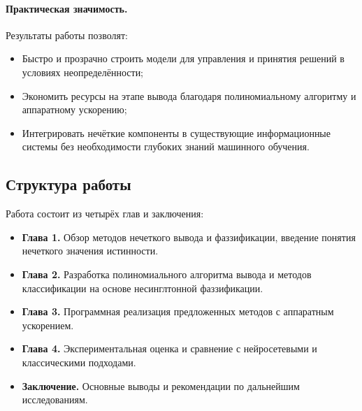\paragraph{Практическая значимость.} 

Результаты работы позволят:
\begin{itemize}
  \item Быстро и прозрачно строить модели для управления и принятия решений в условиях неопределённости;
  \item Экономить ресурсы на этапе вывода благодаря полиномиальному алгоритму и аппаратному ускорению;
  \item Интегрировать нечёткие компоненты в существующие информационные системы без необходимости глубоких знаний машинного обучения.
\end{itemize}

\subsection{Структура работы}

Работа состоит из четырёх глав и заключения:
\begin{itemize}
  \item \textbf{Глава 1.} Обзор методов нечеткого вывода и фаззификации, введение понятия нечеткого значения истинности.
  \item \textbf{Глава 2.} Разработка полиномиального алгоритма вывода и методов классификации на основе несинглтонной фаззификации.
  \item \textbf{Глава 3.} Программная реализация предложенных методов с аппаратным ускорением.
  \item \textbf{Глава 4.} Экспериментальная оценка и сравнение с нейросетевыми и классическими подходами.
  \item \textbf{Заключение.} Основные выводы и рекомендации по дальнейшим исследованиям.
\end{itemize}
